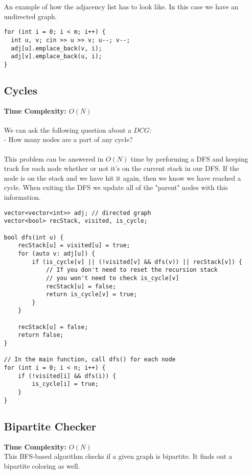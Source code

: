 An example of how the adjacency list has to look like.
In this case we have an undirected graph.
\begin{lstlisting}
for (int i = 0; i < m; i++) {
  int u, v; cin >> u >> v; u--; v--;
  adj[u].emplace_back(v, i);
  adj[v].emplace_back(u, i);
}
\end{lstlisting}

\newpage

\subsection{Cycles}
\textbf{Time Complexity: $O(N)$}\\\\
We can ask the following question about a $DCG$:
\\
 - How many nodes are a part of any cycle?
\\
\\
This problem can be answered in $O(N)$ time by performing a DFS and
keeping track for each node whether or not it's on the current stack in our DFS.
If the node is on the stack and we have hit it again, then we know we have reached a cycle.
When exiting the DFS we update all of the "parent" nodes with this information.

\begin{lstlisting}
vector<vector<int>> adj; // directed graph
vector<bool> recStack, visited, is_cycle;

bool dfs(int u) {
    recStack[u] = visited[u] = true;
    for (auto v: adj[u]) {
        if (is_cycle[v] || (!visited[v] && dfs(v)) || recStack[v]) {
            // If you don't need to reset the recursion stack
            // you won't need to check is_cycle[v]
            recStack[u] = false;
            return is_cycle[v] = true;
        }
    }

    recStack[u] = false;
    return false;
}

// In the main function, call dfs() for each node
for (int i = 0; i < n; i++) {
    if (!visited[i] && dfs(i)) {
        is_cycle[i] = true;
    }
}
\end{lstlisting}

\newpage

\subsection{Bipartite Checker}
\textbf{Time Complexity: $O(N)$}\\

This BFS-based algorithm checks if a given graph is bipartite.
It finds out a bipartite coloring as well.

